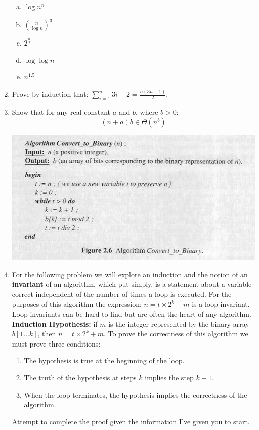 \documentclass[12pt]{article}
\begin{document}
\begin{enumerate}
\begin{enumerate}[a)]
\item $\log{n^n}$\\
\item $(\frac{n}{\log{n}})^3$\\
\item  $2^{\frac{n}{2}}$\\
\item  $\log{\log{n}}$\\
\item  $n^{1.5}$\\
\end{enumerate}
\newpage
\item Prove by induction that: $\sum\limits_{i=1}^{n}{3i-2}=\frac{n(3n-1)}{2}$.
\newpage
\item Show that for any real constant $a$ and $b$, where $b>0$:
$$(n+a)b\in\Theta(n^b)$$
\newpage
\centerline{\includegraphics[scale = 0.6]{algo.jpg}}
\item For the following problem we will explore an induction and the
notion of an \textbf{invariant} of an algorithm, which put simply, is a statement about
a variable correct independent of the number of times a loop is executed. For the purposes of 
this algorithm the expression: $n = t \times 2^k + m$ is a loop invariant. Loop invariants can 
be hard to find but are often the heart of any algorithm.\\
\textbf{Induction Hypothesis: } if $m$ is the integer represented by 
the binary array $b[1\dots k]$, then $n = t \times 2^k + m$. To prove the 
correctness of this algorithm we must prove three conditions:
\begin{enumerate}
\item The hypothesis is true at the beginning of the loop.
\item The truth of the hypothesis at steps $k$ implies the step $k+1$.
\item When the loop terminates, the hypothesis implies the correctness of the algorithm.
\end{enumerate}
Attempt to complete the proof given the information I've given you to start. 
\end{enumerate}
\end{document}
